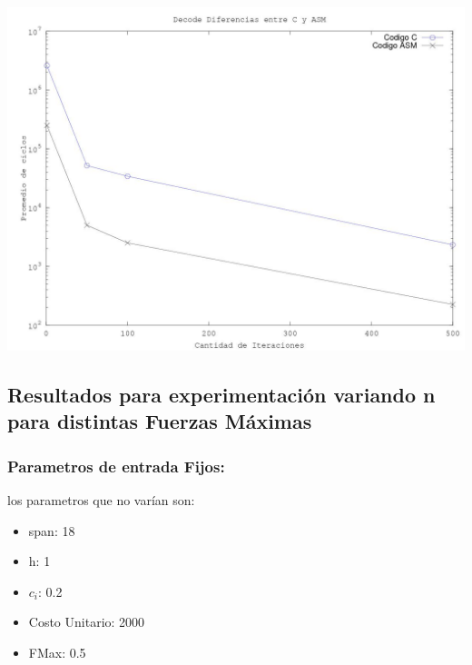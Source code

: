 \begin{center}
 \includegraphics[scale=0.6]{imagenes/octave1.jpg}
\end{center}
\subsection{Resultados para experimentaci\'on variando n para distintas Fuerzas Máximas}
\subsubsection{Parametros de entrada Fijos:}
los parametros que no var\'ian son:
  \begin{itemize}
      \item span: 18
      \item h: 1
      \item $c_i$: 0.2
      \item Costo Unitario: 2000
      \item FMax: 0.5
  \end{itemize}
